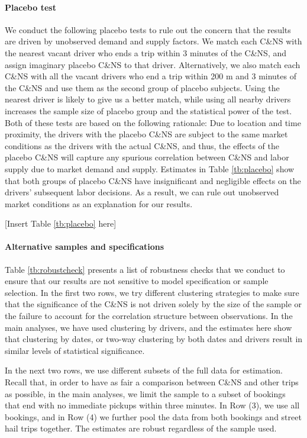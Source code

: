 \documentclass[reviewmode,AEJ]{AEA}
\begin{document}
\paragraph{Placebo test}
We conduct the following placebo tests to rule out the concern that the results are driven by unobserved demand and supply factors. We match each C\&NS with the nearest vacant driver who ends a trip within 3 minutes of the C\&NS, and assign imaginary placebo C\&NS to that driver. Alternatively, we also match each C\&NS with all the vacant drivers who end a trip within 200 m and 3 minutes of the C\&NS and use them as the second group of placebo subjects. Using the nearest driver is likely to give us a better match, while using all nearby drivers increases the sample size of placebo group and the statistical power of the test. Both of these tests are based on the following rationale: Due to location and time proximity, the drivers with the placebo C\&NS are subject to the same market conditions as the drivers with the actual C\&NS, and thus, the effects of the placebo C\&NS will capture any spurious correlation between C\&NS and labor supply due to market demand and supply. Estimates in Table \ref{tb:placebo} show that both groups of placebo C\&NS have insignificant and negligible effects on the drivers' subsequent labor decisions. As a result, we can rule out unobserved market conditions as an explanation for our results.

\begin{center}
    [Insert Table \ref{tb:placebo} here]
\end{center}


\paragraph{Alternative samples and specifications} Table \ref{tb:robustcheck} presents a list of robustness checks that we conduct to ensure that our results are not sensitive to model specification or sample selection. In the first two rows, we try different clustering strategies  to make sure that the significance of the C\&NS is not driven solely by the size of the sample or the failure to account for the correlation structure between observations. In the main analyses, we have used clustering by drivers, and the estimates here show that clustering by dates, or two-way clustering by both dates and drivers result in similar levels of statistical significance. 

In the next two rows, we use different subsets of the full data for estimation. Recall that, in order to have as fair a comparison between C\&NS and other trips as possible, in the main analyses, we limit the sample to a subset of bookings that end with no immediate pickups within three minutes. In Row (3), we use all bookings, and in Row (4) we further pool the data from both bookings and street hail trips together. The estimates are robust regardless of the sample used.
\end{document}
